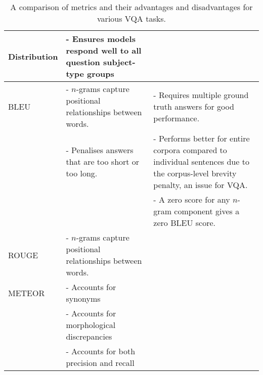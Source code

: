 \begin{table}[htbp]
\begin{footnotesize}
\begin{tabularx}{\linewidth}{@{}lLL@{}}
            Distribution                        & - Ensures models respond well to all question subject-type groups                          &                                                                                                                                                                         \\ \midrule
            BLEU                                & - \(n\)-grams capture positional relationships between words.                              & - Requires multiple ground truth answers for good performance.                                                                                                          \\
                                                & - Penalises answers that are too short or too long.                                        & - Performs better for entire corpora compared to individual sentences due to the corpus-level brevity penalty, an issue for VQA.                                        \\
                                                &                                                                                            & - A zero score for any \(n\)-gram component gives a zero BLEU score.                                                                                                    \\ \midrule
            ROUGE                               & - \(n\)-grams capture positional relationships between words.                              &                                                                                                                                                                         \\ \midrule
            METEOR                              & - Accounts for synonyms                                                                    &                                                                                                                                                                         \\
                                                & - Accounts for morphological discrepancies                                                 &                                                                                                                                                                         \\
                                                & - Accounts for both precision and recall                                                   &                                                                                                                                                                         \\ \bottomrule
    \end{tabularx}
    \end{footnotesize}
    \caption[Advantages and disadvantages of metrics for various VQA tasks]{A comparison of metrics and their advantages and disadvantages for various VQA tasks.}
    \label{tab:vqa_metrics_comparison}
\end{table}

